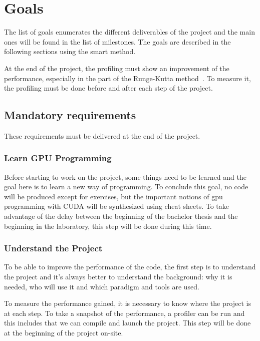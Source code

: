 \chapter{Goals}
\label{spec:ch:goals}

The list of goals enumerates the different deliverables of the project and the main ones will be found in the list of milestones.
The goals are described in the following sections using the \acrshort{smart} method.

At the end of the project, the profiling must show an improvement of the performance, especially in the part of the Runge-Kutta method~\cite{Runge-Kutta-methods}.
To measure it, the profiling must be done before and after each step of the project.


\section{Mandatory requirements}
\label{spec:ch:goals:mandatory-requirements}

These requirements must be delivered at the end of the project.


\subsection{Learn GPU Programming}
\label{spec:ch:goals:mandatory-requirements:learn-gpu-programming}

Before starting to work on the project, some things need to be learned and the goal here is to learn a new way of programming.
To conclude this goal, no code will be produced except for exercises, but the important notions of \acrshort{gpu} programming with CUDA will be synthesized using cheat sheets.
To take advantage of the delay between the beginning of the bachelor thesis and the beginning in the laboratory, this step will be done during this time.


\subsection{Understand the Project}
\label{spec:ch:goals:mandatory-requirements:understand-the-project}

To be able to improve the performance of the code, the first step is to understand the project and it's always better to understand the background: why it is needed, who will use it and which paradigm and tools are used.

To measure the performance gained, it is necessary to know where the project is at each step.
To take a snapshot of the performance, a profiler can be run and this includes that we can compile and launch the project.
This step will be done at the beginning of the project on-site.


